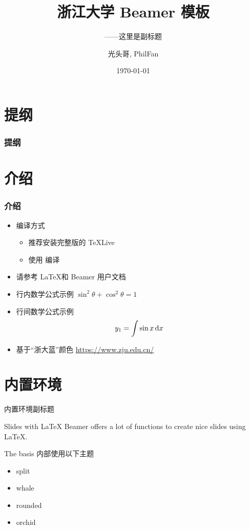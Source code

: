 \documentclass[10pt,aspectratio=169]{beamer}
\title[浙江大学 Beamer 模板]{浙江大学 Beamer 模板}
\subtitle{——这里是副标题}
\author[Guang Touge, PhilFan]{光头哥, PhilFan}
\institute[IOPP]{计算机学院 \\ 浙江大学}
\date{\today}
\begin{document}
\begin{frame}
	\titlepage
\end{frame}				%

\section{提纲}
\begin{frame}
	\frametitle{提纲}
	\tableofcontents
\end{frame}				%

\section{介绍}
\begin{frame}
	\frametitle{介绍}

	\begin{itemize}
		\item {编译方式}
		      \begin{itemize}
			      \item  推荐安装完整版的 TeXLive
			      \item 使用 \XeLaTeX 编译
		      \end{itemize}
		\item 请参考 \LaTeX 和 Beamer 用户文档

		\item 行内数学公式示例 $\sin^2 \theta + \cos^2 \theta = 1$
		\item {行间数学公式示例 \begin{equation}
			      y_{1}=\int \sin x\, {\rm d}x
		      \end{equation}	 }
		\item 基于“浙大蓝”颜色 \url{https://www.zju.edu.cn/}
	\end{itemize}
\end{frame}

\section{内置环境}
\begin{frame}{内置环境}{副标题}
	\begin{block}{Slides with \LaTeX}
		Beamer offers a lot of functions to create nice slides using \LaTeX.
	\end{block}

	\begin{block}{The basis}
		内部使用以下主题
		\begin{itemize}
			\item split
			\item whale
			\item rounded
			\item orchid
		\end{itemize}
	\end{block}
\end{frame}
\end{document}
